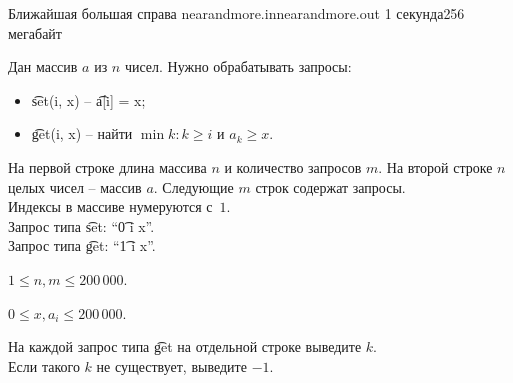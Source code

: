 
\begin{problem}{Ближайшая большая справа}
{nearandmore.in}{nearandmore.out}
{1 секунда}{256 мегабайт}{}

Дан массив $a$ из $n$ чисел. Нужно обрабатывать запросы:
\begin{itemize}
  \setlength{\parskip}{0pt}
  \setlength{\itemsep}{4pt}
  \item{\t{set(i, x)} -- \t{a[i] = x;}}
  \item{\t{get(i, x)} -- найти $\min k \colon k \ge i$ и $a_k \ge x$}.
\end{itemize}

\InputFile

На первой строке длина массива $n$ и количество запросов $m$.
На второй строке $n$ целых чисел -- массив $a$.
Следующие $m$ строк содержат запросы.\\
Индексы в массиве нумеруются с~$1$.\\
Запрос типа \t{set}: ``\t{0 i x}''.\\
Запрос типа \t{get}: ``\t{1 i x}''.

$1 \le n, m \le 200\,000$.

$0 \le x, a_i \le 200\,000$.

\OutputFile

На каждой запрос типа \t{get} на отдельной строке выведите $k$.\\
Если такого $k$ не существует, выведите ${-}1$.

\Examples

\begin{example}
%
\end{example}

\end{problem}
